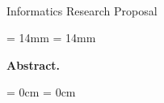 \thispagestyle{plain}

\begin{center}
  \Huge
  \textbf{\@title}\\
  \vspace{.5em}
  \normalsize
  Informatics Research Proposal\\
  \@author
  \vspace{.4em}
\end{center}

\newcommand{\abstractmargin}{14mm}

\leftskip  = \abstractmargin
\rightskip = \abstractmargin

\footnotesize
\noindent
\textbf{Abstract.}


\leftskip  = 0cm
\rightskip = 0cm
\vspace{.5em}
